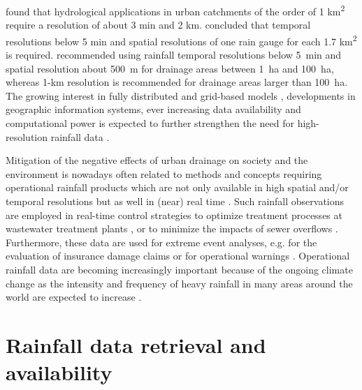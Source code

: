 \documentclass{ctuthesis}\usepackage[]{graphicx}\usepackage[]{color}
\begin{document}
\cite{berneTemporalSpatialResolution2004} found that hydrological applications in urban catchments of the order of 1 km\textsuperscript{2} require a resolution of about 3 min and 2 km. \cite{notaroImpactRainfallData2013} concluded that temporal resolutions below 5 min and spatial resolutions of one rain gauge for each 1.7 km\textsuperscript{2} is required.  \cite{ochoa-rodriguezImpactSpatialTemporal2015} recommended using rainfall temporal resolutions below 5~min and spatial resolution about 500~m for drainage areas between 1~ha and 100~ha, whereas 1-km resolution is recommended  for drainage areas larger than 100~ha. The growing interest in fully distributed and grid-based models \citep{ochoa-rodriguezImpactSpatialTemporal2015, ichibaScaleEffectChallenges2018}, developments in geographic information systems, ever increasing data availability and computational power is expected to further strengthen the need for high-resolution rainfall data \citep{ochoa-rodriguezReviewRadarRain2019, salvadoreHydrologicalModellingUrbanized2015}. 

Mitigation of the negative effects of urban drainage on society and the environment is nowadays often related to methods and concepts requiring operational rainfall products which are not only available in  high spatial and/or temporal resolutions but as well in (near) real time \citep{einfaltRoadmapUseRadar2004}. Such rainfall observations are employed in real-time control strategies to optimize treatment processes at wastewater treatment plants \citep{schutzeRealTimeControl2004}, or to minimize the impacts of sewer overflows \citep{vezzaroGeneralisedDynamicOverflow2014}. Furthermore, these data are used for extreme event analyses, e.g. for the evaluation of insurance damage claims \citep{spekkersStatisticalAnalysisInsurance2013} or for operational warnings \citep{montesarchioRainfallThresholdsFlood2009}. Operational rainfall data are becoming increasingly important because of the ongoing climate change \citep{vanderpolImpactsRainfallVariability2015} as the intensity and frequency of heavy rainfall in many areas around the world are expected to increase \citep{willemsClimateChangeImpact2012}.


\section{Rainfall data retrieval and availability}
\end{document}
